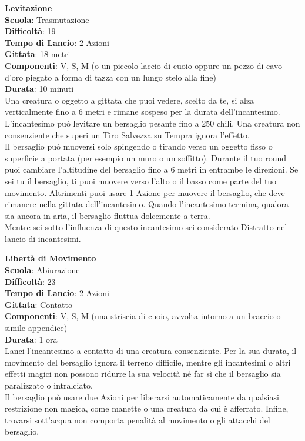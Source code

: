 \begin{multicols}{2}
\medskip\textbf{Levitazione}\\
\textbf{Scuola}: Trasmutazione\\
\textbf{Difficoltà}: 19\\
\textbf{Tempo di Lancio}: 2 Azioni\\
\textbf{Gittata}: 18 metri\\
\textbf{Componenti}: V, S, M (o un piccolo laccio di cuoio oppure un pezzo di cavo d'oro piegato a forma di tazza con un lungo stelo alla fine)\\
\textbf{Durata}: 10 minuti \\
Una creatura o oggetto a gittata che puoi vedere, scelto da te, si alza verticalmente fino a 6 metri e rimane sospeso per la durata dell'incantesimo. L'incantesimo può levitare un bersaglio pesante fino a 250 chili. Una creatura non consenziente che superi un Tiro Salvezza su Tempra ignora l'effetto.\\
Il bersaglio può muoversi solo spingendo o tirando verso un oggetto fisso o superficie a portata (per esempio un muro o un soffitto). Durante il tuo round puoi cambiare l'altitudine del bersaglio fino a 6 metri in entrambe le direzioni. Se sei tu il bersaglio, ti puoi muovere verso l'alto o il basso come parte del tuo movimento. Altrimenti puoi usare 1 Azione per muovere il bersaglio, che deve rimanere nella gittata dell'incantesimo. Quando l'incantesimo termina, qualora sia ancora in aria, il bersaglio fluttua dolcemente a terra.\\
Mentre sei sotto l'influenza di questo incantesimo sei considerato Distratto nel lancio di incantesimi.

\medskip\textbf{Libertà di Movimento}\\
\textbf{Scuola}: Abiurazione\\
\textbf{Difficoltà}: 23\\
\textbf{Tempo di Lancio}: 2 Azioni\\
\textbf{Gittata}: Contatto\\
\textbf{Componenti}: V, S, M (una striscia di cuoio, avvolta intorno a un braccio o simile appendice)\\
\textbf{Durata}: 1 ora\\
Lanci l'incantesimo a contatto di una creatura consenziente. Per la sua durata, il movimento del bersaglio ignora il terreno difficile, mentre gli incantesimi o altri effetti magici non possono ridurre la sua velocità né far sì che il bersaglio sia paralizzato o intralciato.\\
Il bersaglio può usare due Azioni per liberarsi automaticamente da qualsiasi restrizione non magica, come manette o una creatura da cui è afferrato. Infine, trovarsi sott'acqua non comporta penalità al movimento o gli attacchi del bersaglio. 


\end{multicols}

